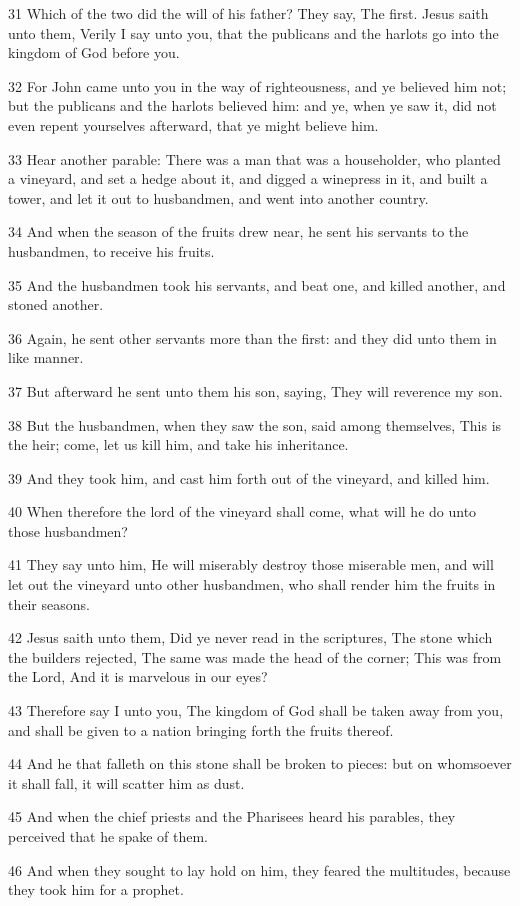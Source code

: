 \par 31 Which of the two did the will of his father? They say, The first. Jesus saith unto them, Verily I say unto you, that the publicans and the harlots go into the kingdom of God before you.
\par 32 For John came unto you in the way of righteousness, and ye believed him not; but the publicans and the harlots believed him: and ye, when ye saw it, did not even repent yourselves afterward, that ye might believe him.
\par 33 Hear another parable: There was a man that was a householder, who planted a vineyard, and set a hedge about it, and digged a winepress in it, and built a tower, and let it out to husbandmen, and went into another country.
\par 34 And when the season of the fruits drew near, he sent his servants to the husbandmen, to receive his fruits.
\par 35 And the husbandmen took his servants, and beat one, and killed another, and stoned another.
\par 36 Again, he sent other servants more than the first: and they did unto them in like manner.
\par 37 But afterward he sent unto them his son, saying, They will reverence my son.
\par 38 But the husbandmen, when they saw the son, said among themselves, This is the heir; come, let us kill him, and take his inheritance.
\par 39 And they took him, and cast him forth out of the vineyard, and killed him.
\par 40 When therefore the lord of the vineyard shall come, what will he do unto those husbandmen?
\par 41 They say unto him, He will miserably destroy those miserable men, and will let out the vineyard unto other husbandmen, who shall render him the fruits in their seasons.
\par 42 Jesus saith unto them, Did ye never read in the scriptures, The stone which the builders rejected, The same was made the head of the corner; This was from the Lord, And it is marvelous in our eyes?
\par 43 Therefore say I unto you, The kingdom of God shall be taken away from you, and shall be given to a nation bringing forth the fruits thereof.
\par 44 And he that falleth on this stone shall be broken to pieces: but on whomsoever it shall fall, it will scatter him as dust.
\par 45 And when the chief priests and the Pharisees heard his parables, they perceived that he spake of them.
\par 46 And when they sought to lay hold on him, they feared the multitudes, because they took him for a prophet.

